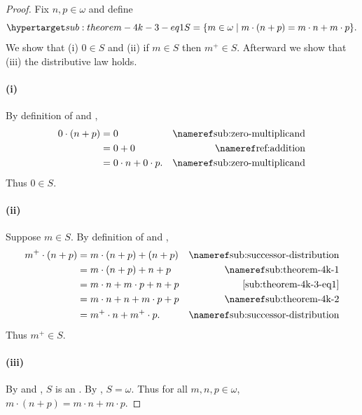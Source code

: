 \documentclass{report}
\begin{document}
  \begin{proof}

    Fix $n, p \in \omega$ and define
      \begin{equation}
        \hyperlabel{sub:theorem-4k-3-eq1}
        S = \{m \in \omega \mid m \cdot (n + p) = m \cdot n + m \cdot p\}.
      \end{equation}
    We show that (i) $0 \in S$ and (ii) if $m \in S$ then $m^+ \in S$.
    Afterward we show that (iii) the distributive law holds.

    \paragraph{(i)}%

      By definition of  and ,
        \begin{align*}
          0 \cdot (n + p)
            & = 0 & \textref{sub:zero-multiplicand} \\
            & = 0 + 0 & \textref{ref:addition} \\
            & = 0 \cdot n + 0 \cdot p. & \textref{sub:zero-multiplicand}
        \end{align*}
      Thus $0 \in S$.

    \paragraph{(ii)}%

      Suppose $m \in S$.
      By definition of  and ,
        \begin{align*}
          m^+ \cdot (n + p)
            & = m \cdot (n + p) + (n + p)
              & \textref{sub:successor-distribution} \\
            & = m \cdot (n + p) + n + p & \textref{sub:theorem-4k-1} \\
            & = m \cdot n + m \cdot p + n + p
              & \eqref{sub:theorem-4k-3-eq1} \\
            & = m \cdot n + n + m \cdot p + p & \textref{sub:theorem-4k-2} \\
            & = m^+ \cdot n + m^+ \cdot p.
              & \textref{sub:successor-distribution}
        \end{align*}
      Thus $m^+ \in S$.

    \paragraph{(iii)}%

      By  and , $S$
        is an .
      By , $S = \omega$.
      Thus for all $m, n, p \in \omega$,
        $m \cdot (n + p) = m \cdot n + m \cdot p$.

  \end{proof}
\end{document}
